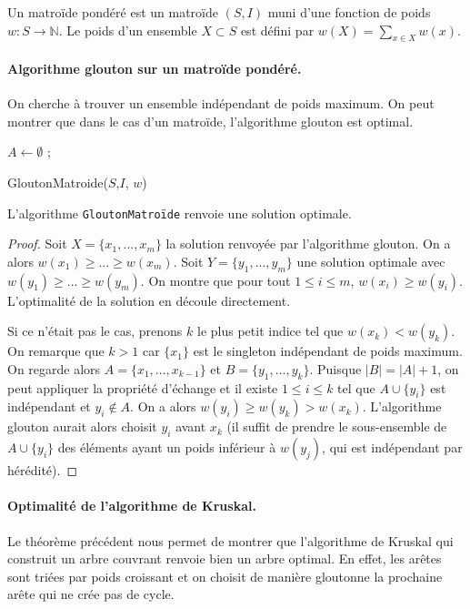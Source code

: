 \begin{definition}
Un matroïde pondéré est un matroïde $(S,I)$ muni d'une fonction de poids $w : S \rightarrow \mathbb{N}$. Le poids d'un ensemble $X\subset S$ est défini par $w(X) = \sum_{x\in X} w(x)$.
\end{definition}

\paragraph{Algorithme glouton sur un matroïde pondéré.}

On cherche à trouver un ensemble indépendant de poids maximum. On peut montrer que dans le cas d'un matroïde, l'algorithme glouton est optimal.

\begin{algorithm}[!h]

$A \leftarrow \emptyset$ ;\\
\caption{GloutonMatroide($S$,$I$, $w$)}
\end{algorithm}

\begin{theorem}
L'algorithme {\tt GloutonMatroïde} renvoie une solution optimale.
\end{theorem}

\begin{proof}

Soit $X=\{x_1,...,x_m\}$ la solution renvoyée par l'algorithme glouton. On a alors $w(x_1) \geq ...\geq w(x_m)$. Soit $Y=\{y_1,...,y_m\}$ une solution optimale avec $w(y_1) \geq ... \geq w(y_m)$. On montre que pour tout $1\leq i \leq m$, $w(x_i) \geq w(y_i)$. L'optimalité de la solution en découle directement.


Si ce n'était pas le cas, prenons $k$ le plus petit indice tel que $w(x_k) < w(y_k)$. On remarque que $k>1$ car $\{x_1\}$ est le singleton indépendant de poids maximum. On regarde alors $A=\{x_1,...,x_{k-1}\}$ et $B=\{ y_1,...,y_k\}$. Puisque $|B|=|A|+1$, on peut appliquer la propriété d'échange et il existe $1\leq i \leq k$ tel que $A\cup\{y_i\}$ est indépendant et $y_i \notin A$. On a alors $w(y_i) \geq w(y_k) > w(x_k)$. L'algorithme glouton aurait alors choisit $y_i$ avant $x_k$ (il suffit de prendre le sous-ensemble de $A\cup \{y_i\}$ des éléments ayant un poids inférieur à $w(y_j)$, qui est indépendant par hérédité).
\end{proof}

\paragraph{Optimalité de l'algorithme de Kruskal.} Le théorème précédent nous permet de montrer que l'algorithme de Kruskal qui construit un arbre couvrant renvoie bien un arbre optimal. En effet, les arêtes sont triées par poids croissant et on choisit de manière gloutonne la prochaine arête qui ne crée pas de cycle. 
